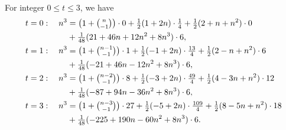 \begin{example}
  For integer $0 \le t \le 3$, we have
  \begin{align*}
    t=0:\quad n^3
    &=
    \bigl(1+\tbinom{n}{-1}\bigr)\cdot0
    +\tfrac{1}{2}(1+2n)\cdot\tfrac{1}{4}
    +\tfrac{1}{2}(2+n+n^2)\cdot0 \\
    &+\tfrac{1}{48}(21+46n+12n^2+8n^3)\cdot6,
    \\
    t=1:\quad n^3
    &=
    \bigl(1+\tbinom{n-1}{-1}\bigr)\cdot1
    +\tfrac{1}{2}(-1+2n)\cdot\tfrac{13}{4}
    +\tfrac{1}{2}(2-n+n^2)\cdot6 \\
    &+\tfrac{1}{48}(-21+46n-12n^2+8n^3)\cdot6,
    \\
    t=2:\quad n^3
    &=
    \bigl(1+\tbinom{n-2}{-1}\bigr)\cdot8
    +\tfrac{1}{2}(-3+2n)\cdot\tfrac{49}{4}
    +\tfrac{1}{2}(4-3n+n^2)\cdot12 \\
    &+\tfrac{1}{48}(-87+94n-36n^2+8n^3)\cdot6,
    \\
    t=3:\quad n^3
    &=
    \bigl(1+\tbinom{n-3}{-1}\bigr)\cdot27
    +\tfrac{1}{2}(-5+2n)\cdot\tfrac{109}{4}
    +\tfrac{1}{2}(8-5n+n^2)\cdot18 \\
    &+\tfrac{1}{48}(-225+190n-60n^2+8n^3)\cdot6.
  \end{align*}
\end{example}
